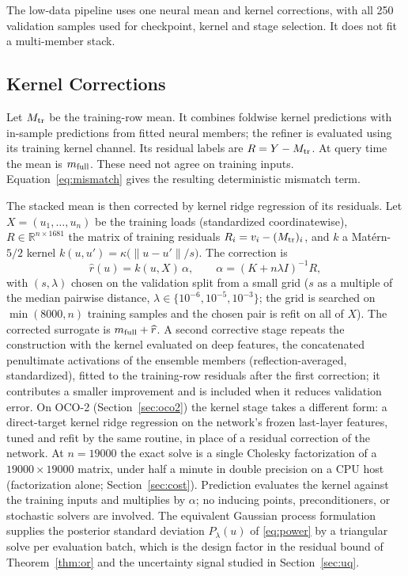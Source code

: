 \documentclass[twoside,11pt]{article}
\begin{document}
The low-data pipeline uses one neural mean and kernel corrections,
with all 250 validation samples used for checkpoint, kernel and stage selection.
It does not fit a multi-member stack.

\subsection{Kernel Corrections}
\label{sec:method-kernel}
Let $M_{\rm tr}$ be the training-row mean. It combines foldwise kernel predictions with in-sample predictions from fitted neural members; the refiner is evaluated using its training kernel channel. Its residual labels are $R=Y-M_{\rm tr}$. At query time the mean is $m_{\rm full}$. These need not agree on training inputs. Equation~\eqref{eq:mismatch} gives the resulting deterministic mismatch term.

The stacked mean is then corrected by kernel ridge regression of its
residuals. Let $X=(u_1,\dots,u_n)$ be the training loads (standardized
coordinatewise), $R\in\mathbb R^{n\times1681}$ the matrix of training
residuals $R_i=v_i-(M_{\rm tr})_i$, and $k$ a Mat\'ern-$5/2$ kernel
$k(u,u')=\kappa\big(\|u-u'\|/s\big)$. The correction is
\[
\widehat r(u)=k(u,X)\,\alpha,\qquad \alpha=(K+n\lambda I)^{-1}R ,
\]
with $(s,\lambda)$ chosen on the validation split from a small grid ($s$ as a
multiple of the median pairwise distance, $\lambda\in\{10^{-6},10^{-5},10^{-3}\}$;
the grid is searched on $\min(8000,n)$ training samples and the chosen pair is refit
on all of $X$). The corrected surrogate is $m_{\rm full}+\widehat r$. A second corrective
stage repeats the construction with the kernel evaluated on deep features,
the concatenated penultimate activations of the ensemble members
(reflection-averaged, standardized), fitted to the training-row residuals after the first correction; it contributes a smaller improvement and is included when it reduces
validation error. On OCO-2 (Section~\ref{sec:oco2}) the kernel stage takes a
different form: a direct-target kernel ridge regression on the network's
frozen last-layer features, tuned and refit by the same routine, in place of
a residual correction of the network. At $n=19000$ the exact solve is a single Cholesky factorization
of a $19000\times19000$ matrix, under half a minute in double precision on a
CPU host (factorization alone; Section~\ref{sec:cost}). Prediction
evaluates the kernel against the training inputs and multiplies by $\alpha$;
no inducing points, preconditioners, or stochastic solvers are
involved. The equivalent Gaussian process formulation
supplies the posterior standard deviation
$P_\lambda(u)$ of \eqref{eq:power} by a triangular solve per evaluation batch, which is the design factor in the residual
bound of Theorem~\ref{thm:or} and the uncertainty signal studied in
Section~\ref{sec:uq}.
\end{document}
